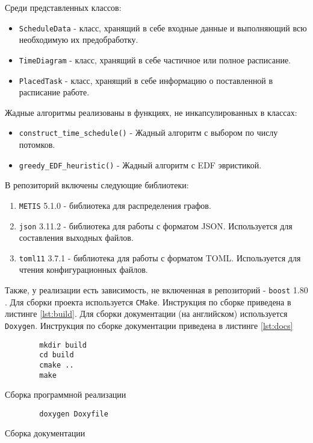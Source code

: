 Среди представленных классов:
\begin{itemize}
    \item \texttt{ScheduleData} - класс, хранящий в себе входные данные и выполняющий всю необходимую их предобработку.
    \item \texttt{TimeDiagram} - класс, хранящий в себе частичное или полное расписание.
    \item \texttt{PlacedTask} - класс, хранящий в себе информацию о поставленной в расписание работе.
\end{itemize}

Жадные алгоритмы реализованы в функциях, не инкапсулированных в классах:
\begin{itemize}
    \item \texttt{construct\_time\_schedule()} - Жадный алгоритм с выбором по числу потомков.
    \item \texttt{greedy\_EDF\_heuristic()} - Жадный алгоритм с EDF эвристикой.
\end{itemize}

В репозиторий включены следующие библиотеки:
\begin{enumerate}
    \item \texttt{METIS} 5.1.0 \cite{METIS_lib} - библиотека для распределения графов.
    \item \texttt{json} 3.11.2 \cite{json_lib} - библиотека для работы с форматом JSON. Используется для составления выходных файлов.
    \item \texttt{toml11} 3.7.1 \cite{toml11_lib} - библиотека для работы с форматом TOML. Используется для чтения конфигурационных файлов.
\end{enumerate}

Также, у реализации есть зависимость, не включенная в репозиторий - \texttt{boost} 1.80 \cite{boost_framework}. Для сборки проекта используется \texttt{CMake}. Инструкция по сборке приведена в листинге \ref{lst:build}. Для сборки документации (на английском) используется \texttt{Doxygen}. Инструкция по сборке документации приведена в листинге \ref{lst:docs}

\begin{listing}[!htbp]
    \begin{verbatim}
        mkdir build
        cd build
        cmake ..
        make
    \end{verbatim}
    \caption{Сборка программной реализации}
    \label{lst:build}
\end{listing}

\begin{listing}[!htbp]
    \begin{verbatim}
        doxygen Doxyfile
    \end{verbatim}
    \caption{Сборка документации}
    \label{lst:docs}
\end{listing}


